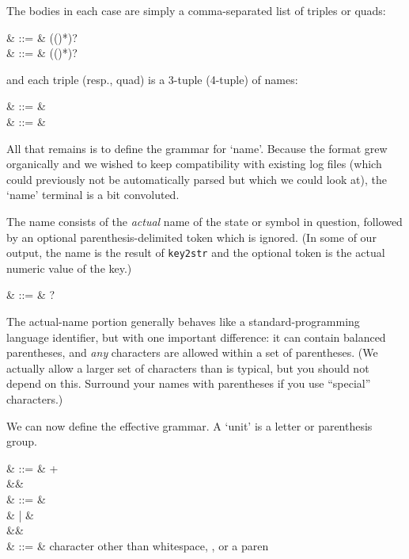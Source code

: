 The bodies in each case are simply a comma-separated list of triples
or quads:

\begin{grammar}
   & ::= & (\cfgsp  (\term{,}\cfgsp  {})*)? \\
     & ::= & (\cfgsp  (\term{,}\cfgsp  {})*)?
\end{grammar}

and each triple (resp., quad) is a 3-tuple (4-tuple) of names:

\begin{grammar}
   & ::= &  \term{(}\cfgsp  {}\cfgsp \term{,}\cfgsp  {}\cfgsp  \term{,}\cfgsp  {}\cfgsp  \term{)} \\
   & ::= &  \term{(}\cfgsp  {}\cfgsp \term{,}\cfgsp  {}\cfgsp  \term{,}\cfgsp  {}\cfgsp  \term{,}\cfgsp  {}\cfgsp  \term{)}
\end{grammar}


All that remains is to define the grammar for `name'. Because the
format grew organically and we wished to keep compatibility with
existing log files (which could previously not be automatically parsed
but which we could look at), the `name' terminal is a bit convoluted.

The name consists of the \textsl{actual} name of the state or symbol
in question, followed by an optional parenthesis-delimited token which
is ignored. (In some of our output, the name is the result of
\texttt{key2str} and the optional token is the actual numeric value of
the key.)

\begin{grammar}
   & ::= &  \cfgsp  {}?
\end{grammar}

The actual-name portion generally behaves like a standard-programming
language identifier, but with one important difference: it can contain
balanced parentheses, and \textsl{any} characters are allowed within a
set of parentheses. (We actually allow a larger set of characters than
is typical, but you should not depend on this. Surround your names
with parentheses if you use ``special'' characters.)

We can now define the effective grammar. A `unit' is a letter or
parenthesis group.

\begin{grammar}
   & ::= &  + \\
&& \\
   & ::= &   \\
                 &   | &   \\
&& \\
  & ::= &  \textrm{character other than whitespace, \term{,}, or a paren}
\end{grammar}

